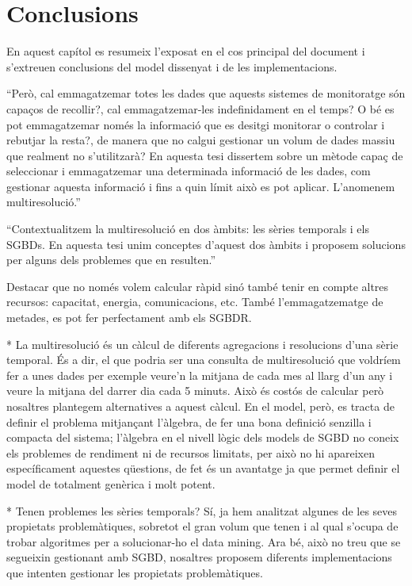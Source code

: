 \chapter{Conclusions}
\label{sec:conclusions}



En aquest capítol es resumeix l'exposat en el cos principal del
document i s'extreuen conclusions del model dissenyat i de les
implementacions.


``Però, cal emmagatzemar totes les dades que aquests sistemes de
monitoratge són capaços de recollir?, cal emmagatzemar-les
indefinidament en el temps? O bé es pot emmagatzemar només la
informació que es desitgi monitorar o controlar i rebutjar la resta?,
de manera que no calgui gestionar un volum de dades massiu que
realment no s'utilitzarà? En aquesta tesi dissertem sobre un mètode
capaç de seleccionar i emmagatzemar una determinada informació de les
dades, com gestionar aquesta informació i fins a quin límit això es pot
aplicar. L'anomenem multiresolució.''

``Contextualitzem la multiresolució en dos àmbits: les sèries temporals
i els \glspl{SGBD}. En aquesta tesi unim conceptes d'aquest dos àmbits
i proposem solucions per alguns dels problemes que en resulten.''


Destacar que no només volem calcular ràpid sinó també tenir en compte altres recursos: capacitat, energia, comunicacions, etc.
També l'emmagatzematge de metades, es  pot fer perfectament amb els SGBDR.

\todo{}
* La multiresolució és un càlcul de diferents agregacions i resolucions d'una sèrie temporal. És a dir, el que podria ser una consulta de multiresolució que voldríem fer a unes dades per exemple veure'n la mitjana de cada mes al llarg d'un any i veure la mitjana del darrer dia cada 5 minuts. Això és costós de calcular però nosaltres plantegem alternatives a aquest càlcul. En el model, però, es tracta de definir el problema mitjançant l'àlgebra, de fer una bona definició senzilla i compacta del sistema; l'àlgebra en el nivell lògic dels models de SGBD no coneix els problemes de rendiment ni de recursos limitats, per això no hi apareixen específicament aquestes qüestions, de fet és un avantatge ja que permet definir el model de totalment genèrica i molt potent.

* Tenen problemes les sèries temporals? Sí, ja hem analitzat algunes de les seves propietats problemàtiques, sobretot el gran volum que tenen i al qual s'ocupa de trobar algoritmes per a solucionar-ho el data mining. Ara bé, això no treu que se segueixin gestionant amb SGBD, nosaltres proposem diferents implementacions que intenten gestionar les propietats problemàtiques.


